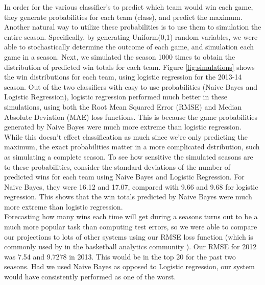 \documentclass{article} %
\begin{document}
In order for the various classifier's to predict which team would win each game, they generate probabilities for each team (class), and predict the maximum. Another natural way to utilize these probabilities is to use them to simulation the entire season. Specifically, by generating Uniform(0,1) random variables, we were able to stochastically determine the outcome of each game, and simulation each game in a season. Next, we simulated the season 1000 times to obtain the distribution of predicted win totals for each team. Figure \ref{fig:simulations} shows the win distributions for each team, using logistic regression for the 2013-14 season. Out of the two classifiers with easy to use probabilities (Naive Bayes and Logistic Regression), logistic regression performed much better in these simulations, using both the Root Mean Squared Error (RMSE) and Median Absolute Deviation (MAE) loss functions. This is because the game probabilities generated by Naive Bayes were much more extreme than logistic regression. While this doesn't effect classification as much since we're only predicting the maximum, the exact probabilities matter in a more complicated dstribution, such as simulating a complete season. To see how sensitive the simulated seasons are to these probabilities, consider the standard deviations of the number of predicted wins for each team using Naive Bayes and Logistic Regression. For Naive Bayes, they were 16.12 and 17.07, compared with 9.66 and 9.68 for logistic regression. This shows that the win totals predicted by Naive Bayes were much more extreme than logistic regression. \\

Forecasting how many wins each time will get during a seasons turns out to be a much more popular task than computing test errors, so we were able to compare our projections to lots of other systems using our RMSE loss function (which is commonly used by in the basketball analytics community \cite{projections}). Our RMSE for 2012 was 7.54 and 9.7278 in 2013. This would be in the top 20 for the past two seasons. Had we used Naive Bayes as opposed to Logistic regression, our system would have consistently performed as one of the worst. 
\end{document}

